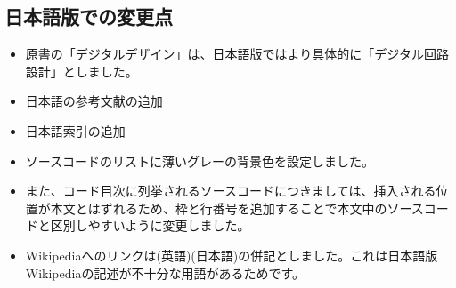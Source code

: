 \documentclass[%
    10pt,
    headinclude, footexclude,
    openright, %
    notitlepage,
    cleardoubleempty,
    headsepline,
    pointlessnumbers,
    bibtotoc, idxtotoc,
    ]{scrbook}
\newif\ifshoworiginal
\newif\ifshowtrans
\begin{document}
\begin{flushleft}
\subsection*{日本語版での変更点}

\begin{itemize}
    \item 原書の「デジタルデザイン」は、日本語版ではより具体的に「デジタル回路設計」としました。
    \item 日本語の参考文献の追加
    \item 日本語索引の追加
    \item ソースコードのリストに薄いグレーの背景色を設定しました。
    \item また、コード目次に列挙されるソースコードにつきましては、挿入される位置が本文とはずれるため、枠と行番号を追加することで本文中のソースコードと区別しやすいように変更しました。
    \item Wikipediaへのリンクは(英語)(日本語)の併記としました。これは日本語版Wikipediaの記述が不十分な用語があるためです。
\end{itemize}


\fi %

\mainmatter

\ifshoworiginal
\chapter{Introduction}
\fi
\ifshowtrans %

\end{flushleft}
\end{document}
